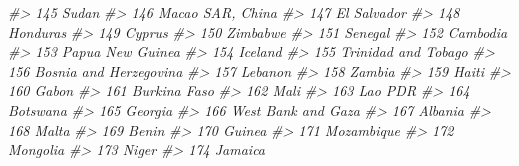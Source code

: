 \documentclass[
  xelatex, ja=standard]{bxjsbook}
\newenvironment{Shaded}{\begin{snugshade}}{\end{snugshade}}
\newcommand{\CommentTok}[1]{\textcolor[rgb]{0.56,0.35,0.01}{\textit{#1}}}
\theoremstyle{definition}
\theoremstyle{definition}
\theoremstyle{definition}
\theoremstyle{definition}
\theoremstyle{remark}
\begin{document}
\begin{Shaded}
\begin{Highlighting}[]
\CommentTok{\#\textgreater{} 145                                                Sudan}
\CommentTok{\#\textgreater{} 146                                     Macao SAR, China}
\CommentTok{\#\textgreater{} 147                                          El Salvador}
\CommentTok{\#\textgreater{} 148                                             Honduras}
\CommentTok{\#\textgreater{} 149                                               Cyprus}
\CommentTok{\#\textgreater{} 150                                             Zimbabwe}
\CommentTok{\#\textgreater{} 151                                              Senegal}
\CommentTok{\#\textgreater{} 152                                             Cambodia}
\CommentTok{\#\textgreater{} 153                                     Papua New Guinea}
\CommentTok{\#\textgreater{} 154                                              Iceland}
\CommentTok{\#\textgreater{} 155                                  Trinidad and Tobago}
\CommentTok{\#\textgreater{} 156                               Bosnia and Herzegovina}
\CommentTok{\#\textgreater{} 157                                              Lebanon}
\CommentTok{\#\textgreater{} 158                                               Zambia}
\CommentTok{\#\textgreater{} 159                                                Haiti}
\CommentTok{\#\textgreater{} 160                                                Gabon}
\CommentTok{\#\textgreater{} 161                                         Burkina Faso}
\CommentTok{\#\textgreater{} 162                                                 Mali}
\CommentTok{\#\textgreater{} 163                                              Lao PDR}
\CommentTok{\#\textgreater{} 164                                             Botswana}
\CommentTok{\#\textgreater{} 165                                              Georgia}
\CommentTok{\#\textgreater{} 166                                   West Bank and Gaza}
\CommentTok{\#\textgreater{} 167                                              Albania}
\CommentTok{\#\textgreater{} 168                                                Malta}
\CommentTok{\#\textgreater{} 169                                                Benin}
\CommentTok{\#\textgreater{} 170                                               Guinea}
\CommentTok{\#\textgreater{} 171                                           Mozambique}
\CommentTok{\#\textgreater{} 172                                             Mongolia}
\CommentTok{\#\textgreater{} 173                                                Niger}
\CommentTok{\#\textgreater{} 174                                              Jamaica}

\end{Highlighting}
\end{Shaded}
\end{document}
